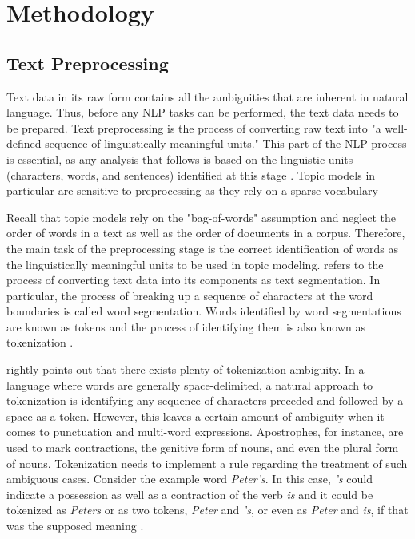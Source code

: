 \documentclass[11pt,a4paper,english,oneside]{book}
\numberwithin{equation}{chapter}
\begin{document}
	


\section{Methodology}


\subsection{Text Preprocessing}\label{preprocessing}
Text data in its raw form contains all the ambiguities that are inherent in natural language. Thus, before any NLP tasks can be performed, the text data needs to be prepared. Text preprocessing is the process of converting raw text into "a well-defined sequence of linguistically meaningful units." This part of the NLP process is essential, as any analysis that follows is based on the linguistic units (characters, words, and sentences) identified at this stage \cite[p. 9]{Palmer.2010}. Topic models in particular are sensitive to preprocessing as they rely on a sparse vocabulary \cite[p. 288]{Schofield.2016}

Recall that topic models rely on the "bag-of-words" assumption and neglect the order of words in a text as well as the order of documents in a corpus. Therefore, the main task of the preprocessing stage is the correct identification of words as the linguistically meaningful units to be used in topic modeling. \citet[p. 10]{Palmer.2010} refers to the process of converting text data into its components as text segmentation. In particular, the process of breaking up a sequence of characters at the word boundaries is called word segmentation. Words identified by word segmentations are known as tokens and the process of identifying them is also known as tokenization \citep[p. 10]{Palmer.2010}.

\citet[pp. 16-19]{Palmer.2010} rightly points out that there exists plenty of tokenization ambiguity. In a language where words are generally space-delimited, a natural approach to tokenization is identifying any sequence of characters preceded and followed by a space as a token. However, this leaves a certain amount of ambiguity when it comes to punctuation and multi-word expressions. Apostrophes, for instance, are used to mark contractions, the genitive form of nouns, and even the plural form of nouns. Tokenization needs to implement a rule regarding the treatment of such ambiguous cases. Consider the example word \textit{Peter's}. In this case, \textit{'s} could indicate a possession as well as a contraction of the verb \textit{is} and it could be tokenized as \textit{Peters} or as two tokens, \textit{Peter} and \textit{'s}, or even as \textit{Peter} and \textit{is}, if that was the supposed meaning \cite[pp. 16-19]{Palmer.2010}.
\end{document}
